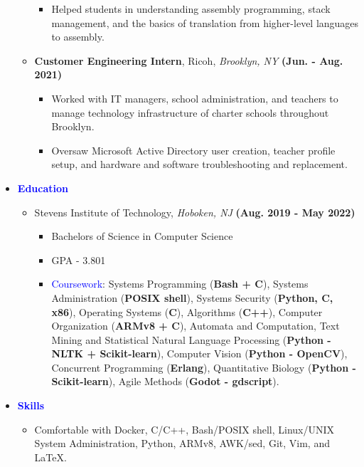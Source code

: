 \documentclass[11pt]{article}
\begin{document}
\begin{flushleft}
\begin{itemize}
\begin{itemize}
\begin{itemize}
                    \item Helped students in understanding assembly programming, stack management, and the basics of translation from higher-level languages to assembly.
                \end{itemize}
            \item \textbf{Customer Engineering Intern}, Ricoh, \textit{Brooklyn, NY} \hfill{\textbf{(Jun. - Aug. 2021)}}
                \begin{itemize}
                    \item Worked with IT managers, school administration, and teachers to manage technology infrastructure of charter schools throughout Brooklyn.
                    \item Oversaw Microsoft Active Directory user creation, teacher profile setup, and hardware and software troubleshooting and replacement.
                \end{itemize}
        \end{itemize}
    \item[] \Large \textcolor{blue}{\textbf{Education}} \normalsize
        \begin{itemize}
            \item Stevens Institute of Technology, \textit{Hoboken, NJ}  \hfill{\textbf{(Aug. 2019 - May 2022)}}
                \begin{itemize}
                    \item Bachelors of Science in Computer Science
                    \item GPA - 3.801
                    \item \textcolor{blue}{Coursework}: Systems Programming (\textbf{Bash + C}), Systems Administration (\textbf{POSIX shell}), Systems Security (\textbf{Python, C, x86}), Operating Systems (\textbf{C}), Algorithms (\textbf{C++}), Computer Organization (\textbf{ARMv8 + C}), Automata and Computation, Text Mining and Statistical Natural Language Processing (\textbf{Python - NLTK + Scikit-learn}), Computer Vision (\textbf{Python - OpenCV}), Concurrent Programming (\textbf{Erlang}), Quantitative Biology (\textbf{Python - Scikit-learn}), Agile Methods (\textbf{Godot - gdscript}).
                \end{itemize}
        \end{itemize}
    \item[] \Large \textcolor{blue}{\textbf{Skills}} \normalsize
        \begin{itemize}
            \item Comfortable with Docker, C/C++, Bash/POSIX shell, Linux/UNIX System Administration, Python, ARMv8, AWK/sed, Git, Vim, and LaTeX.

\end{itemize}
\end{itemize}
\end{flushleft}
\end{document}

